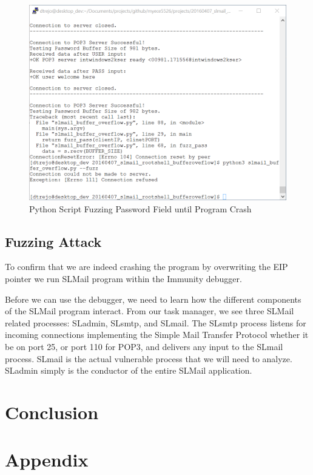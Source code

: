 \documentclass[12pt]{article}
\begin{document}
\begin{figure}[htbp]
    \centering
    \includegraphics[width=5.5in]{images/20160411_python_overflow.png}
    \caption{Python Script Fuzzing Password Field until Program Crash}
    \label{fig:passfuzz}
\end{figure}

\subsection{Fuzzing Attack}
\label{sect:fuzzatt}

To confirm that we are indeed crashing the program by overwriting the EIP
pointer we run SLMail program within the Immunity debugger. 

Before we can use the debugger, we need to learn how the different components
of the SLMail program interact. From our task manager, we see three SLMail
related processes: SLadmin, SLsmtp, and SLmail. The SLsmtp process
listens for incoming connections implementing the Simple Mail Transfer Protocol 
whether it be on port 25, or port 110 for POP3, and delivers any input to 
the SLmail process. SLmail is the actual vulnerable process that we will
need to analyze. SLadmin simply is the conductor of the entire SLMail 
application. 



\section{Conclusion}
\label{sect:conclusion}


\nocite{*}



\section*{Appendix}
\label{sect:appendix}

\end{document}
